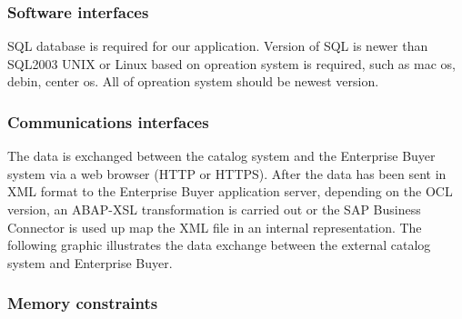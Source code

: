 \subsubsection{Software interfaces}
SQL database is required for our application. Version of SQL is newer than SQL2003
UNIX or Linux based on opreation system is required, such as mac os, debin, center os. All of opreation system should be newest version.




\subsubsection{Communications interfaces}
The data is exchanged between the catalog system and the Enterprise Buyer system via a web browser (HTTP or HTTPS).
After the data has been sent in XML format to the Enterprise Buyer application server, depending on the OCL version, 
an ABAP-XSL transformation is carried out or the SAP Business Connector is used up map the XML file in an internal representation. 
The following graphic illustrates the data exchange between the external catalog system and Enterprise Buyer. 


\subsubsection{Memory constraints}

